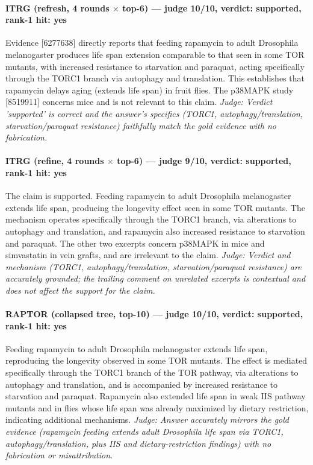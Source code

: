 \documentclass[sigconf, review, anonymous]{acmart}
\begin{document}
\paragraph{ITRG (refresh, 4 rounds $\times$ top-6) --- judge 10/10, verdict: supported, rank-1 hit: yes}
\noindent Evidence [6277638] directly reports that feeding rapamycin to adult Drosophila melanogaster produces life span extension comparable to that seen in some TOR mutants, with increased resistance to starvation and paraquat, acting specifically through the TORC1 branch via autophagy and translation. This establishes that rapamycin delays aging (extends life span) in fruit flies. The p38MAPK study [8519911] concerns mice and is not relevant to this claim.
\noindent\small\textit{Judge: Verdict 'supported' is correct and the answer's specifics (TORC1, autophagy/translation, starvation/paraquat resistance) faithfully match the gold evidence with no fabrication.}
\paragraph{ITRG (refine, 4 rounds $\times$ top-6) --- judge 9/10, verdict: supported, rank-1 hit: yes}
\noindent The claim is supported. Feeding rapamycin to adult Drosophila melanogaster extends life span, producing the longevity effect seen in some TOR mutants. The mechanism operates specifically through the TORC1 branch, via alterations to autophagy and translation, and rapamycin also increased resistance to starvation and paraquat. The other two excerpts concern p38MAPK in mice and simvastatin in vein grafts, and are irrelevant to the claim.
\noindent\small\textit{Judge: Verdict and mechanism (TORC1, autophagy/translation, starvation/paraquat resistance) are accurately grounded; the trailing comment on unrelated excerpts is contextual and does not affect the support for the claim.}
\paragraph{RAPTOR (collapsed tree, top-10) --- judge 10/10, verdict: supported, rank-1 hit: yes}
\noindent Feeding rapamycin to adult Drosophila melanogaster extends life span, reproducing the longevity observed in some TOR mutants. The effect is mediated specifically through the TORC1 branch of the TOR pathway, via alterations to autophagy and translation, and is accompanied by increased resistance to starvation and paraquat. Rapamycin also extended life span in weak IIS pathway mutants and in flies whose life span was already maximized by dietary restriction, indicating additional mechanisms.
\noindent\small\textit{Judge: Answer accurately mirrors the gold evidence (rapamycin feeding extends adult Drosophila life span via TORC1, autophagy/translation, plus IIS and dietary-restriction findings) with no fabrication or misattribution.}
\end{document}
